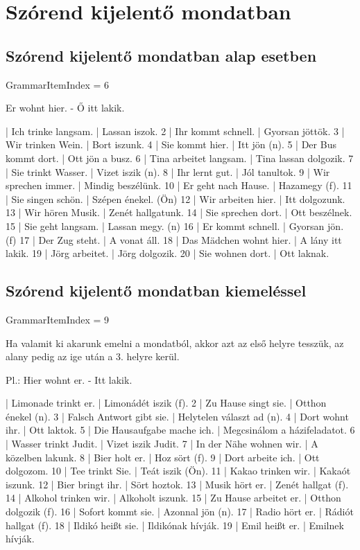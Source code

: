 \documentclass{article}
\newenvironment{desc}{\verbatim}{\endverbatim}
\newenvironment{exmp}{\verbatim}{\endverbatim}
\begin{document}
\section{Szórend kijelentő mondatban}

\subsection{Szórend kijelentő mondatban alap esetben}

GrammarItemIndex = 6

\begin{desc}
Er wohnt hier. - Ő itt lakik.
\end{desc}

\begin{exmp}
1 | Ich trinke langsam. | Lassan iszok.
2 | Ihr kommt schnell. | Gyorsan jöttök.
3 | Wir trinken Wein. | Bort iszunk.
4 | Sie kommt hier. | Itt jön (n).
5 | Der Bus kommt dort. | Ott jön a busz.
6 | Tina arbeitet langsam. | Tina lassan dolgozik.
7 | Sie trinkt Wasser. | Vizet iszik (n).
8 | Ihr lernt gut. | Jól tanultok.
9 | Wir sprechen immer. | Mindig beszélünk.
10 | Er geht nach Hause. | Hazamegy (f).
11 | Sie singen schön. | Szépen énekel. (Ön)
12 | Wir arbeiten hier. | Itt dolgozunk.
13 | Wir hören Musik. | Zenét hallgatunk.
14 | Sie sprechen dort. | Ott beszélnek.
15 | Sie geht langsam. | Lassan megy. (n)
16 | Er kommt schnell. | Gyorsan jön. (f)
17 | Der Zug steht. | A vonat áll.
18 | Das Mädchen wohnt hier. | A lány itt lakik.
19 | Jörg arbeitet. | Jörg dolgozik.
20 | Sie wohnen dort. | Ott laknak.
\end{exmp}

\subsection{Szórend kijelentő mondatban kiemeléssel}

GrammarItemIndex = 9

\begin{desc}
Ha valamit ki akarunk emelni a mondatból, akkor azt az első helyre tesszük, az alany pedig az ige után a 3. helyre kerül.

Pl.: Hier wohnt er. - Itt lakik.
\end{desc}

\begin{exmp}
1 | Limonade trinkt er. | Limonádét iszik (f).
2 | Zu Hause singt sie. | Otthon énekel (n).
3 | Falsch Antwort gibt sie. | Helytelen választ ad (n).
4 | Dort wohnt ihr. | Ott laktok.
5 | Die Hausaufgabe mache ich. | Megcsinálom a házifeladatot.
6 | Wasser trinkt Judit. | Vizet iszik Judit.
7 | In der Nähe wohnen wir. | A közelben lakunk.
8 | Bier holt er. | Hoz sört (f).
9 | Dort arbeite ich. | Ott dolgozom.
10 | Tee trinkt Sie. | Teát iszik (Ön).
11 | Kakao trinken wir. | Kakaót iszunk.
12 | Bier bringt ihr. | Sört hoztok.
13 | Musik hört er. | Zenét hallgat (f).
14 | Alkohol trinken wir. | Alkoholt iszunk.
15 | Zu Hause arbeitet er. | Otthon dolgozik (f).
16 | Sofort kommt sie. | Azonnal jön (n).
17 | Radio hört er. | Rádiót hallgat (f).
18 | Ildikó heißt sie. | Ildikónak hívják.
19 | Emil heißt er. | Emilnek hívják.
\end{exmp}
\end{document}
